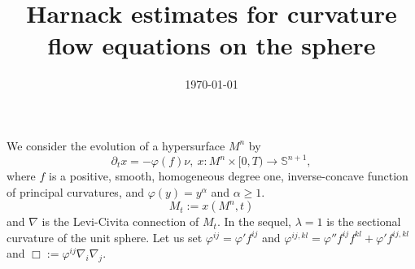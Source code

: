\documentclass{amsart}
\newtheorem*{thmmain}{Theorem}
\theoremstyle{definition}
\theoremstyle{remark}
\numberwithin{equation}{section}
\begin{document}
\title[]
 {Harnack estimates for curvature flow equations on the sphere}

\curraddr{}
\email{}
\date{\today}

\dedicatory{}
\subjclass[2010]{}
\keywords{}

\begin{abstract}
\end{abstract}

\maketitle
We consider the evolution of a hypersurface $M^n$ by
\[\partial_tx=-\varphi(f)\nu,~ x:M^n\times[0,T)\to \mathbb{S}^{n+1},\]
where $f$ is a positive, smooth, homogeneous degree one, inverse-concave function of principal curvatures, and $\varphi(y)=y^{\alpha}$ and $\alpha\geq1.$
\[M_t:=x(M^n,t)\]
and $\nabla$ is the Levi-Civita connection of $M_t.$
In the sequel, $\lambda =1$ is the sectional curvature of the unit sphere.
Let us set $\varphi^{ij}=\varphi'f^{ij}$ and $\varphi^{ij,kl}=\varphi''f^{ij}f^{kl}+\varphi'f^{ij,kl}$ and  $\Box:=\varphi^{ij}\nabla_i\nabla_j.$
\end{document}
